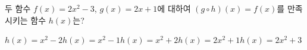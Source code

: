 \hspace*{2mm}\begin{minipage}[t]{\dimexpr\linewidth-2mm\relax}\vspace{0pt}
두 함수 $f(x)=2x^2-3$, $g(x)=2x+1$에 대하여 $(g\circ h)(x)=f(x)$를 만족시키는 함수 $h(x)$는?
\begin{choicesii}{$h(x)=x^2-2$}{$h(x)=x^2-1$}{$h(x)=x^2+2$}{$h(x)=2x^2+1$}{$h(x)=2x^2+3$}\end{choicesii}\end{minipage}
